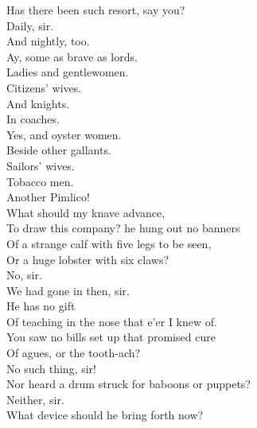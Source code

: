 \documentclass[a4paper,oneside]{memoir}
\begin{document}
\begin{drama*}
\lovewitspeaks Has there been such resort, say you?\\
\neighonespeaks {} Daily, sir.\\
\neightwospeaks And nightly, too.\\
\neighthreespeaks {} Ay, some as brave as lords.\\
\neighfourspeaks Ladies and gentlewomen.\\
\neighfivespeaks {} Citizens' wives.\\
\neighonespeaks And knights.\\
\neighsixspeaks {} In coaches.\\
\neightwospeaks {} Yes, and oyster women.\\
\neighonespeaks Beside other gallants.\\
\neighthreespeaks {} Sailors' wives.\\
\neighfourspeaks {} Tobacco men.\\
\neighfivespeaks Another Pimlico!\\
\lovewitspeaks {} What should my knave advance,\\
To draw this company? he hung out no banners\\
Of a strange calf with five legs to be seen,\\
Or a huge lobster with six claws?\\
\neighsixspeaks {} No, sir.\\
\neighthreespeaks We had gone in then, sir.\\
\lovewitspeaks {} He has no gift\\
Of teaching in the nose that e'er I knew of.\\
You saw no bills set up that promised cure\\
Of agues, or the tooth-ach?\\
\neightwospeaks {} No such thing, sir!\\
\lovewitspeaks Nor heard a drum struck for baboons or puppets?\\
\neighfivespeaks Neither, sir.\\
\lovewitspeaks {} What device should he bring forth now?\\

\end{drama*}
\end{document}
